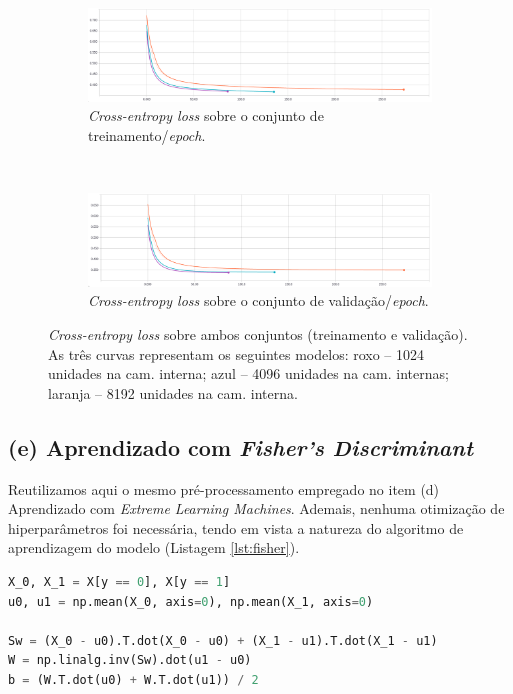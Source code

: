 \documentclass[12pt]{report}
\begin{document}
\begin{figure}[H]
	\centering
	\begin{subfigure}[b]{.95\textwidth}
		\includegraphics[width=\textwidth]{assets/train}
		\caption{\textit{Cross-entropy loss} sobre o conjunto de treinamento/\textit{epoch}.}
		\label{fig:em_loss}
	\end{subfigure}
	~\begin{subfigure}[b]{.95\textwidth}
		\includegraphics[width=\textwidth]{assets/val}
		\caption{\textit{Cross-entropy loss} sobre o conjunto de validação/\textit{epoch}.}
		\label{fig:em_val_loss}
	\end{subfigure}
	\caption{\textit{Cross-entropy loss} sobre ambos conjuntos (treinamento e validação). As três curvas representam os seguintes modelos: roxo -- 1024 unidades na cam. interna; azul -- 4096 unidades na cam. internas; laranja -- 8192 unidades na cam. interna.}
	\label{fig:em_train_losses}
\end{figure}

\subsection{(e) Aprendizado com \textit{Fisher's Discriminant}}

Reutilizamos aqui o mesmo pré-processamento empregado no item (d) Aprendizado com \textit{Extreme Learning Machines}. Ademais, nenhuma otimização de hiperparâmetros foi necessária, tendo em vista a natureza do algoritmo de aprendizagem do modelo (Listagem \ref{lst:fisher}).

\begin{lstlisting}[language=Python, caption={Construção do modelo baseado no discriminante de Fisher. Ao final, as variáveis $W$ e $b$ conterão os parâmetros do modelo.}, label={lst:fisher}]
X_0, X_1 = X[y == 0], X[y == 1]
u0, u1 = np.mean(X_0, axis=0), np.mean(X_1, axis=0)

Sw = (X_0 - u0).T.dot(X_0 - u0) + (X_1 - u1).T.dot(X_1 - u1)
W = np.linalg.inv(Sw).dot(u1 - u0)
b = (W.T.dot(u0) + W.T.dot(u1)) / 2
\end{lstlisting}
\end{document}
